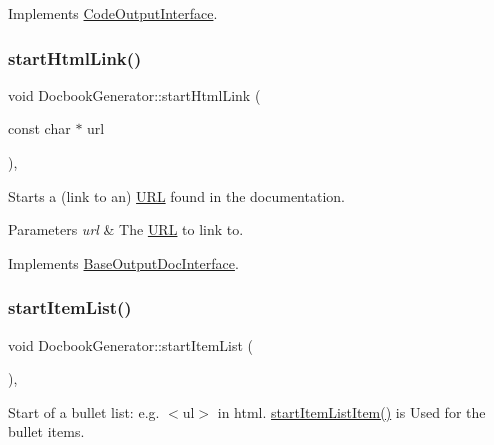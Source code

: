 Implements \mbox{\hyperlink{class_code_output_interface_ac90f75968cdcf127e0b02938bdb49d87}{Code\+Output\+Interface}}.

\mbox{\label{class_docbook_generator_adf4463cfec2c9d8ca083367f2e4afeff}} 
\subsubsection{\texorpdfstring{startHtmlLink()}{startHtmlLink()}}
{\footnotesize\ttfamily void Docbook\+Generator\+::start\+Html\+Link (\begin{DoxyParamCaption}\item[{const char $\ast$}]{url }\end{DoxyParamCaption})\hspace{0.3cm}{\ttfamily [inline]}, {\ttfamily [virtual]}}

Starts a (link to an) \mbox{\hyperlink{struct_u_r_l}{U\+RL}} found in the documentation. 
\begin{DoxyParams}{Parameters}
{\em url} & The \mbox{\hyperlink{struct_u_r_l}{U\+RL}} to link to. \\
\hline
\end{DoxyParams}


Implements \mbox{\hyperlink{class_base_output_doc_interface_ab52dbf41ce337c701f9cd1e7794f80e7}{Base\+Output\+Doc\+Interface}}.

\mbox{\label{class_docbook_generator_addaf6b46396259a8bbebe7b1e9716bc0}} 
\subsubsection{\texorpdfstring{startItemList()}{startItemList()}}
{\footnotesize\ttfamily void Docbook\+Generator\+::start\+Item\+List (\begin{DoxyParamCaption}{ }\end{DoxyParamCaption})\hspace{0.3cm}{\ttfamily [inline]}, {\ttfamily [virtual]}}

Start of a bullet list\+: e.\+g. {\ttfamily $<$ul$>$} in html. \mbox{\hyperlink{class_docbook_generator_a2ee84d2ec43dc1634a71ee3101eab3e4}{start\+Item\+List\+Item()}} is Used for the bullet items. 

